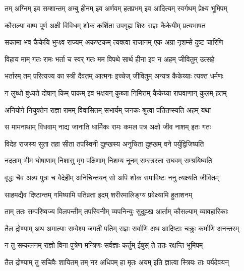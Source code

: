 
\twolineshloka
{तम् अग्निम् इव सम्शान्तम् अम्बु हीनम् इव अर्णवम्}
{हतप्रभम् इव आदित्यम् स्वर्गथम् प्रेक्ष्य भूमिपम्} %

\twolineshloka
{कौसल्या बाष्प पूर्ण अक्षी विविधम् शोक कर्शिता}
{उपगृह्य शिरः राज्ञः कैकेयीम् प्रत्यभाषत} %

\twolineshloka
{सकामा भव कैकेयि भुन्क्ष्व राज्यम् अकण्टकम्}
{त्यक्त्वा राजानम् एक अग्रा नृशम्से दुष्ट चारिणि} %

\twolineshloka
{विहाय माम् गतः रामः भर्ता च स्वर् गतः मम}
{विपथे सार्थ हीना इव न अहम् जीवितुम् उत्सहे} %

\twolineshloka
{भर्तारम् तम् परित्यज्य का स्त्री दैवतम् आत्मनः}
{इच्चेज् जीवितुम् अन्यत्र कैकेय्याः त्यक्त धर्मणः} %

\twolineshloka
{न लुब्धो बुध्यते दोषान् किम् पाकम् इव भक्षयन्}
{कुब्जा निमित्तम् कैकेय्या राघवाणान् कुलम् हतम्} %

\twolineshloka
{अनियोगे नियुक्तेन राज्ञा रामम् विवासितम्}
{सभार्यम् जनकः श्रुत्वा पतितप्स्यति अहम् यथा} %

\twolineshloka
{स मामनाथाम् विधवाम् नाद्य जानाति धार्मिकः}
{रामः कमल पत्र अक्षो जीव नाशम् इतः गतः} %

\twolineshloka
{विदेह राजस्य सुता तहा सीता तपस्विनी}
{दुह्खस्य अनुचिता दुह्खम् वने पर्युद्विजिष्यति} %

\twolineshloka
{नदताम् भीम घोषाणाम् निशासु मृग पक्षिणाम्}
{निशम्य नूनम् सम्स्त्रस्ता राघवम् सम्श्रयिष्यति} %

\twolineshloka
{वृद्धः चैव अल्प पुत्रः च वैदेहीम् अनिचिन्तयन्}
{सो अपि शोक समाविष्टः ननु त्यक्ष्यति जीवितम्} %

\twolineshloka
{साहमद्यैव दिष्टान्तम् गमिष्यामि पतिव्रता}
{इदम् शरीरमालिङ्ग्य प्रवेक्ष्यामि हुताशनम्} %

\twolineshloka
{ताम् ततः सम्परिष्वज्य विलपन्तीम् तपस्विनीम्}
{व्यपनिन्युः सुदुह्ख आर्ताम् कौसल्याम् व्यावहारिकाः} %

\twolineshloka
{तैल द्रोण्याम् अथ अमात्याः सम्वेश्य जगती पतिम्}
{राज्ञः सर्वाणि अथ आदिष्टाः चक्रुः कर्माणि अनन्तरम्} %

\twolineshloka
{न तु सम्कलनम् राज्ञो विना पुत्रेण मन्त्रिणः}
{सर्वज्ञाः कर्तुम् ईषुस् ते ततः रक्षन्ति भूमिपम्} %

\twolineshloka
{तैल द्रोण्याम् तु सचिवैः शायितम् तम् नर अधिपम्}
{हा मृतः अयम् इति ज्ञात्वा स्त्रियः ताः पर्यदेवयन्} %

